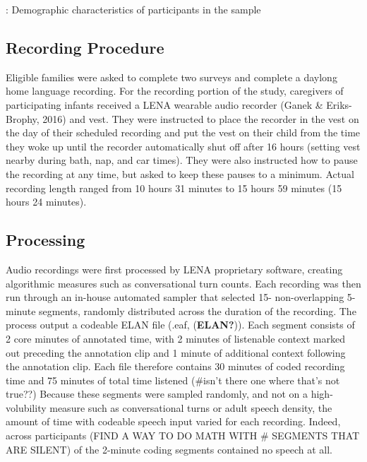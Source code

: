 \documentclass[
  man]{apa6}
\begin{document}
: Demographic characteristics of participants in the sample

\hypertarget{recording-procedure}{%
\subsection{Recording Procedure}\label{recording-procedure}}

Eligible families were asked to complete two surveys and complete a daylong home language recording. For the recording portion of the study, caregivers of participating infants received a LENA wearable audio recorder (Ganek \& Eriks-Brophy, 2016) and vest. They were instructed to place the recorder in the vest on the day of their scheduled recording and put the vest on their child from the time they woke up until the recorder automatically shut off after 16 hours (setting vest nearby during bath, nap, and car times). They were also instructed how to pause the recording at any time, but asked to keep these pauses to a minimum. Actual recording length ranged from 10 hours 31 minutes to 15 hours 59 minutes (15 hours 24 minutes).

\hypertarget{processing}{%
\subsection{Processing}\label{processing}}

Audio recordings were first processed by LENA proprietary software, creating algorithmic measures such as conversational turn counts. Each recording was then run through an in-house automated sampler that selected 15- non-overlapping 5-minute segments, randomly distributed across the duration of the recording. The process output a codeable ELAN file (.eaf, (\textbf{ELAN?})). Each segment consists of 2 core minutes of annotated time, with 2 minutes of listenable context marked out preceding the annotation clip and 1 minute of additional context following the annotation clip. Each file therefore contains 30 minutes of coded recording time and 75 minutes of total time listened (\#isn't there one where that's not true??) Because these segments were sampled randomly, and not on a high-volubility measure such as conversational turns or adult speech density, the amount of time with codeable speech input varied for each recording. Indeed, across participants (FIND A WAY TO DO MATH WITH \# SEGMENTS THAT ARE SILENT) of the 2-minute coding segments contained no speech at all.
\end{document}
